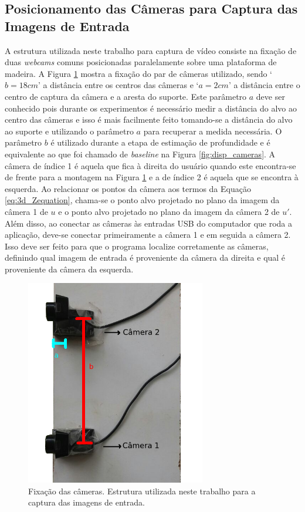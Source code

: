 \subsection{Posicionamento das Câmeras para Captura das Imagens de Entrada}


A estrutura utilizada neste trabalho para captura de vídeo consiste na fixação
de duas \textit{webcams} comuns posicionadas paralelamente sobre uma plataforma
de madeira. A Figura \ref{fig:setupCameras} mostra a fixação do par de câmeras
utilizado, sendo `$b = 18cm$'  a distância entre os centros das câmeras e `$a =
2 cm$' a distância entre o centro de captura da câmera e a aresta do suporte.
Este parâmetro $a$ deve ser conhecido pois durante os experimentos é necessário
medir a distância do alvo ao centro das câmeras e isso é mais facilmente feito
tomando-se a distância do alvo ao suporte e utilizando o parâmetro $a$ para
recuperar a medida necessária. O parâmetro $b$ é utilizado durante a etapa de
estimação de profundidade e é equivalente ao que foi chamado de
\textit{baseline} na Figura \ref{fig:disp_cameras}. A câmera de índice 1 é
aquela que fica à direita do usuário quando este encontra-se de frente para a
montagem na Figura \ref{fig:setupCameras} e a de índice 2 é aquela que se
encontra à esquerda. Ao relacionar os pontos da câmera aos termos da Equação
\ref{eq:3d_Zequation}, chama-se o ponto alvo projetado no plano da imagem da
câmera 1 de $u$ e o ponto alvo projetado no plano da imagem da câmera 2 de $u'$.
Além disso, ao conectar as câmeras às entradas USB do computador que roda a
aplicação, deve-se conectar primeiramente a câmera 1 e em seguida a câmera 2.
Isso deve ser feito para que o programa localize corretamente as câmeras,
definindo qual imagem de entrada é proveniente da câmera da direita e qual é
proveniente da câmera da esquerda. 


\begin{figure}[!htb]
\centering
\includegraphics[width=0.7\textwidth]{figs/setupExperimento-marcado_edit-2.png}
\caption{Fixação das câmeras. Estrutura utilizada neste trabalho para a captura das imagens de entrada.}
\label{fig:setupCameras}
\end{figure}



